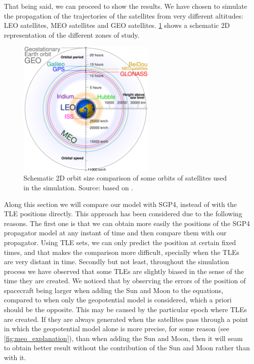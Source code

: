 \documentclass[../main.tex]{subfiles}
\begin{document}
That being said, we can proceed to show the results. We have chosen to simulate the propagation of the trajectories of the satellites from very different altitudes: LEO satellites, MEO satellites and GEO satellites. \cref{fig:satellite_orbits} shows a schematic 2D representation of the different zones of study.
\begin{figure}[ht]
  \centering
  \includegraphics[width=0.6\textwidth]{Images/satellite_orbits_custom.pdf}
  \caption{Schematic 2D orbit size comparison of some orbits of satellites used in the simulation. Source: based on \cite{wiki:sat_orbits}.}
  \label{fig:satellite_orbits}
\end{figure}

Along this section we will compare our model with SGP4, instead of with the TLE positions directly. This approach has been considered due to the following reasons. The first one is that we can obtain more easily the positions of the SGP4 propagator model at any instant of time and then compare them with our propagator. Using TLE sets, we can only predict the position at certain fixed times, and that makes the comparison more difficult, specially when the TLEs are very distant in time. Secondly but not least, throughout the simulation process we have observed that some TLEs are slightly biased in the sense of the time they are created. We noticed that by observing the errors of the position of spacecraft being larger when adding the Sun and Moon to the equations, compared to when only the geopotential model is considered, which a priori should be the opposite. This may be caused by the particular epoch where TLEs are created. If they are always generated when the satellites pass through a point in which the geopotential model alone is more precise, for some reason (see \cref{fig:meo_explanation}), than when adding the Sun and Moon, then it will seam to obtain better result without the contribution of the Sun and Moon rather than with it.
\end{document}
